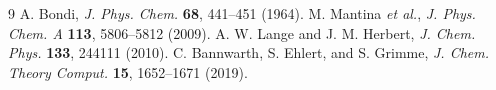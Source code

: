 \documentclass[11pt,a4paper]{article}
\begin{document}
\begin{thebibliography}{9}
 A. Bondi, \emph{J. Phys. Chem.} \textbf{68}, 441--451 (1964).
 M. Mantina \emph{et al.}, \emph{J. Phys. Chem. A}
\textbf{113}, 5806--5812 (2009).
 A. W. Lange and J. M. Herbert, \emph{J. Chem. Phys.}
\textbf{133}, 244111 (2010).
 C. Bannwarth, S. Ehlert, and S. Grimme,
\emph{J. Chem. Theory Comput.} \textbf{15}, 1652--1671 (2019).
\end{thebibliography}
\end{document}
